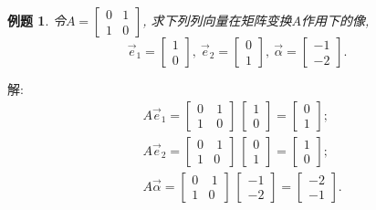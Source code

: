 \documentclass[a4paper]{book}
\newtheorem{eg}{例题}[chapter]
\begin{document}
\begin{eg}
令$A=\begin{bmatrix}0&1\\1&0\end{bmatrix}$, 求下列列向量在矩阵变换$A$作用下的像,
\begin{displaymath}
\vec{e}_1=\begin{bmatrix}1\\0\end{bmatrix},\ \vec{e}_2=\begin{bmatrix}0\\1\end{bmatrix},\ \vec{\alpha}=\begin{bmatrix}-1\\-2\end{bmatrix}.\end{displaymath}
\end{eg}
解: \begin{displaymath}\begin{aligned}
&A\vec{e}_1=\begin{bmatrix}0&\ 1\\1&\ 0\end{bmatrix}\ \begin{bmatrix}1\\0\end{bmatrix}
=\begin{bmatrix}0\\1\end{bmatrix};\\
&A\vec{e}_2=\begin{bmatrix}0&\ 1\\1&0\end{bmatrix}\ \begin{bmatrix}0\\1\end{bmatrix}
=\begin{bmatrix}1\\0\end{bmatrix};\\
&A\vec{\alpha}=\begin{bmatrix}0&\ 1\\1&0\end{bmatrix}\ \begin{bmatrix}-1\\-2\end{bmatrix}
=\begin{bmatrix}-2\\-1\end{bmatrix}.
\end{aligned}\end{displaymath}
\end{document}
